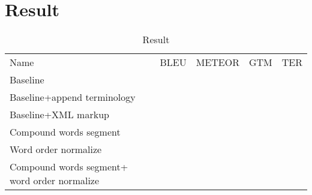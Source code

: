 \documentclass[a4paper]{article}
\begin{document}
\section{Result}
\begin{table}
    \centering
    \begin{tabular}{l|r|r|r|r}
        Name & BLEU & METEOR & GTM & TER \\
        Baseline & & & & \\
        Baseline+append terminology & & & & \\
        Baseline+XML markup & & & & \\
        Compound words segment& & & &\\
        Word order normalize & & & &\\
        Compound words segment+ word order normalize & & & &\\
    \end{tabular}
    \caption{Result}
    \label{tab:result}
\end{table}
\end{document}
